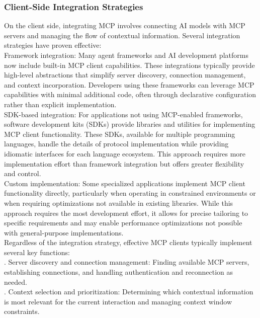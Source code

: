 \subsubsection{Client-Side Integration Strategies}
On the client side, integrating MCP involves connecting AI models with MCP servers and managing the flow of contextual information. Several integration strategies have proven effective:\\ \newline
Framework integration: Many agent frameworks and AI development platforms now include built-in MCP client capabilities. These integrations typically provide high-level abstractions that simplify server discovery, connection management, and context incorporation. Developers using these frameworks can leverage MCP capabilities with minimal additional code, often through declarative configuration rather than explicit implementation.\\ \newline
SDK-based integration: For applications not using MCP-enabled frameworks, software development kits (SDKs) provide libraries and utilities for implementing MCP client functionality. These SDKs, available for multiple programming languages, handle the details of protocol implementation while providing idiomatic interfaces for each language ecosystem. This approach requires more implementation effort than framework integration but offers greater flexibility and control.\\ \newline
Custom implementation: Some specialized applications implement MCP client functionality directly, particularly when operating in constrained environments or when requiring optimizations not available in existing libraries. While this approach requires the most development effort, it allows for precise tailoring to specific requirements and may enable performance optimizations not possible with general-purpose implementations.\\ \newline
Regardless of the integration strategy, effective MCP clients typically implement several key functions:\\ . Server discovery and connection management: Finding available MCP servers, establishing connections, and handling authentication and reconnection as needed.\\ . Context selection and prioritization: Determining which contextual information is most relevant for the current interaction and managing context window constraints.\\ \newline

